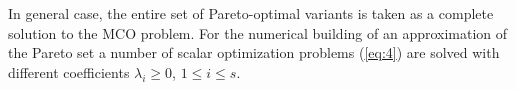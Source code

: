 \documentclass[runningheads]{llncs}
\begin{document}
In general case, the entire set of Pareto-optimal variants is taken as a complete solution to the MCO problem. For the numerical building of an approximation of the Pareto set a number of scalar optimization problems (\ref{eq:4}) are solved with different coefficients $\lambda_i \geq 0$, $1 \leq i \leq s$.





%
%
%
% 
% 
%


\end{document}
